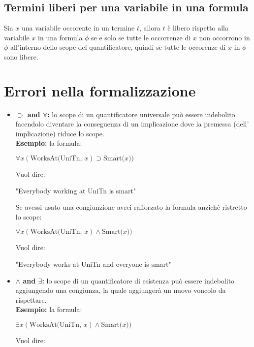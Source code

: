 \documentclass[../main.tex]{subfiles}
\begin{document}
   \subsection{Termini liberi per una variabile in una formula}
   Sia $x$ una variabile occorente in un termine $t$, allora $t$ è libero rispetto alla variabile $x$ in una formula $\phi$ se e solo se tutte le occorrenze di $x$ non occorrono in $\phi$ all'interno dello scope del quantificatore, quindi se tutte le occorenze di $x$ in $\phi$ sono libere.

   \section{Errori nella formalizzazione}
   \begin{itemize}
      \item \textbf{$\supset$ and $\forall$:} lo scope di un quantificatore universale può essere indebolito facendolo diventare la conseguenza di un implicazione dove la premessa (dell' implicazione) riduce lo scope.\\
         \textbf{Esempio:} la formula:
         \begin{center}
            $\forall x(\text{WorksAt(UniTn, }x) \supset \text{Smart(}x))$
         \end{center}
         Vuol dire:
         \begin{center}
            "Everybody working at UniTn is smart"
         \end{center}
         Se avessi usato una congiunzione avrei rafforzato la formula anzichè ristretto lo scope:
         \begin{center}
            $\forall x(\text{WorksAt(UniTn, }x) \land \text{Smart(}x))$
         \end{center}
         Vuol dire:
         \begin{center}
            "Everybody works at UniTn and everyone is smart"
         \end{center}
      \item \textbf{$\land$ and $\exists$:} lo scope di un quantificatore di esistenza può essere indebolito aggiungendo una congiunza, la quale aggiungerà un nuovo voncolo da rispettare.\\
         \textbf{Esempio:} la formula:
         \begin{center}
            $\exists x(\text{WorksAt(UniTn, }x) \land \text{Smart(}x))$
         \end{center}
         Vuol dire:
         \begin{center}

\end{center}
\end{itemize}
\end{document}

